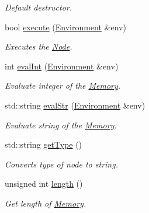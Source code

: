 \begin{DoxyCompactItemize}
\begin{DoxyCompactList}\small\item\em Default destructor. \end{DoxyCompactList}\item 
bool \hyperlink{classMemory_ae00c898b45732c0bf74140d604363319}{execute} (\hyperlink{classEnvironment}{Environment} \&env)
\begin{DoxyCompactList}\small\item\em Executes the \hyperlink{classNode}{Node}. \end{DoxyCompactList}\item 
int \hyperlink{classMemory_a0bf9b7657489146568ae62137c684522}{eval\+Int} (\hyperlink{classEnvironment}{Environment} \&env)
\begin{DoxyCompactList}\small\item\em Evaluate integer of the \hyperlink{classMemory}{Memory}. \end{DoxyCompactList}\item 
std\+::string \hyperlink{classMemory_a298bdf094ac4807ad563f76f5bf159d0}{eval\+Str} (\hyperlink{classEnvironment}{Environment} \&env)
\begin{DoxyCompactList}\small\item\em Evaluate string of the \hyperlink{classMemory}{Memory}. \end{DoxyCompactList}\item 
std\+::string \hyperlink{classMemory_a222e2dc37b587f8c243aabc1eebcf7a1}{get\+Type} ()
\begin{DoxyCompactList}\small\item\em Converts type of node to string. \end{DoxyCompactList}\item 
unsigned int \hyperlink{classMemory_a55d46c565490996d8680cdb78cca6a76}{length} ()
\begin{DoxyCompactList}\small\item\em Get length of \hyperlink{classMemory}{Memory}. \end{DoxyCompactList}\end{DoxyCompactItemize}
